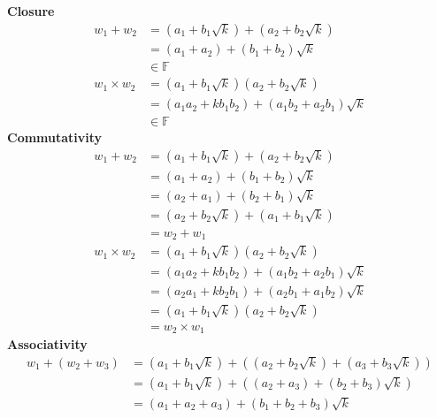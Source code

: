 \documentclass[addpoints]{exam}
\theoremstyle{mytheoremstyle}
\theoremstyle{mytheoremstyle}
\theoremstyle{myproblemstyle}
\begin{document}
\begin{questions}
\begin{parts}
\begin{solution}
			\textbf{Closure}
			\begin{align*}
				w_{1}+w_{2}       & = (a_{1}+b_{1}\sqrt{k})+(a_{2}+b_{2}\sqrt{k})              \\
				                  & = (a_{1}+a_{2})+(b_{1}+b_{2})\sqrt{k}                      \\
				                  & \in\mathbb{F}                                              \\
				w_{1}\times w_{2} & = (a_{1}+b_{1}\sqrt{k})(a_{2}+b_{2}\sqrt{k})               \\
				                  & = (a_{1}a_{2}+kb_{1}b_{2})+(a_{1}b_{2}+a_{2}b_{1})\sqrt{k} \\
				                  & \in\mathbb{F}
			\end{align*}
			\textbf{Commutativity}
			\begin{align*}
				w_{1}+w_{2}       & = (a_{1}+b_{1}\sqrt{k})+(a_{2}+b_{2}\sqrt{k})              \\
				                  & = (a_{1}+a_{2})+(b_{1}+b_{2})\sqrt{k}                      \\
				                  & = (a_{2}+a_{1})+(b_{2}+b_{1})\sqrt{k}                      \\
				                  & = (a_{2}+b_{2}\sqrt{k})+(a_{1}+b_{1}\sqrt{k})              \\
				                  & = w_{2}+w_{1}                                              \\
				w_{1}\times w_{2} & = (a_{1}+b_{1}\sqrt{k})(a_{2}+b_{2}\sqrt{k})               \\
				                  & = (a_{1}a_{2}+kb_{1}b_{2})+(a_{1}b_{2}+a_{2}b_{1})\sqrt{k} \\
				                  & = (a_{2}a_{1}+kb_{2}b_{1})+(a_{2}b_{1}+a_{1}b_{2})\sqrt{k} \\
				                  & = (a_{1}+b_{1}\sqrt{k})(a_{2}+b_{2}\sqrt{k})               \\
				                  & = w_{2}\times w_{1}
			\end{align*}
			\textbf{Associativity}
			\begin{align*}
				w_{1}+(w_{2}+w_{3})             & = (a_{1}+b_{1}\sqrt{k})+((a_{2}+b_{2}\sqrt{k})+(a_{3}+b_{3}\sqrt{k}))             \\
				                                & = (a_{1}+b_{1}\sqrt{k})+((a_{2}+a_{3})+(b_{2}+b_{3})\sqrt{k})                     \\
				                                & = (a_{1}+a_{2}+a_{3})+(b_{1}+b_{2}+b_{3})\sqrt{k}                                 \\

\end{align*}
\end{solution}
\end{parts}
\end{questions}
\end{document}
